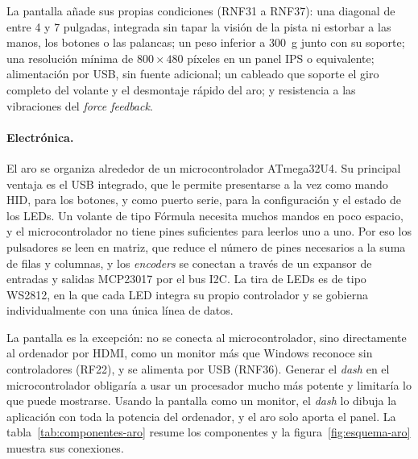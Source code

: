 La pantalla añade sus propias condiciones (RNF31 a RNF37): una diagonal de entre 4 y 7 pulgadas, integrada sin tapar la visión de la pista ni estorbar a las manos, los botones o las palancas; un peso inferior a 300~g junto con su soporte; una resolución mínima de $800\times480$ píxeles en un panel IPS o equivalente; alimentación por USB, sin fuente adicional; un cableado que soporte el giro completo del volante y el desmontaje rápido del aro; y resistencia a las vibraciones del \textit{force feedback}.

\paragraph{Electrónica.}
El aro se organiza alrededor de un microcontrolador ATmega32U4. Su principal ventaja es el USB integrado, que le permite presentarse a la vez como mando HID, para los botones, y como puerto serie, para la configuración y el estado de los LEDs. Un volante de tipo Fórmula necesita muchos mandos en poco espacio, y el microcontrolador no tiene pines suficientes para leerlos uno a uno. Por eso los pulsadores se leen en matriz, que reduce el número de pines necesarios a la suma de filas y columnas, y los \textit{encoders} se conectan a través de un expansor de entradas y salidas MCP23017 por el bus I2C. La tira de LEDs es de tipo WS2812, en la que cada LED integra su propio controlador y se gobierna individualmente con una única línea de datos.

La pantalla es la excepción: no se conecta al microcontrolador, sino directamente al ordenador por HDMI, como un monitor más que Windows reconoce sin controladores (RF22), y se alimenta por USB (RNF36). Generar el \textit{dash} en el microcontrolador obligaría a usar un procesador mucho más potente y limitaría lo que puede mostrarse. Usando la pantalla como un monitor, el \textit{dash} lo dibuja la aplicación con toda la potencia del ordenador, y el aro solo aporta el panel. La tabla~\ref{tab:componentes-aro} resume los componentes y la figura~\ref{fig:esquema-aro} muestra sus conexiones.

